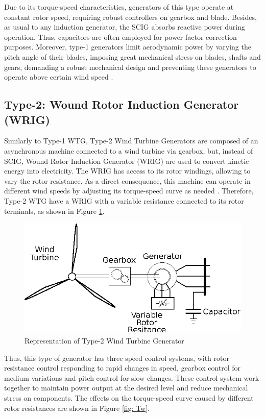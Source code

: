 Due to its torque-speed characteristics, generators of this type operate at constant rotor speed, requiring robust controllers on gearbox and blade. Besides, as usual to any induction generator, the SCIG absorbs reactive power during operation. Thus, capacitors are often employed for power factor correction purposes. Moreover, type-1 generators limit aerodynamic power by varying the pitch angle of their blades, imposing great mechanical stress on blades, shafts and gears, demanding a robust mechanical design and preventing these generators to operate above certain wind speed \cite{Ellis2011}. 

\subsection{Type-2: Wound Rotor Induction Generator (WRIG)}

Similarly to Type-1 WTG, Type-2 Wind Turbine Generators are composed of an asynchronous machine connected to a wind turbine via gearbox, but, instead of SCIG, Wound Rotor Induction Generator (WRIG) are used to convert kinetic energy into electricity. The WRIG has access to its rotor windings, allowing to vary the rotor resistance. As a direct consequence, this machine can operate in different wind speeds by adjusting its torque-speed curve as needed \cite{Ellis2011}. Therefore, Type-2 WTG have a WRIG with a variable resistance connected to its rotor terminals, as shown in Figure \ref{fig: WTG2}.

\begin{figure}[h]
	\caption{Representation of Type-2 Wind Turbine Generator}
	\begin{center}
		\includegraphics[scale=.8]{Images/Type2WTG.eps}
	\end{center}
	\label{fig: WTG2}
\end{figure}

Thus, this type of generator has three speed control systems, with rotor resistance control responding to rapid changes in speed, gearbox control for medium variations and pitch control for slow changes. These control system work together to maintain power output at the desired level and reduce mechanical stress on components. The effects on the torque-speed curve caused by different rotor resistances are shown in Figure \ref{fig: Tw}.

